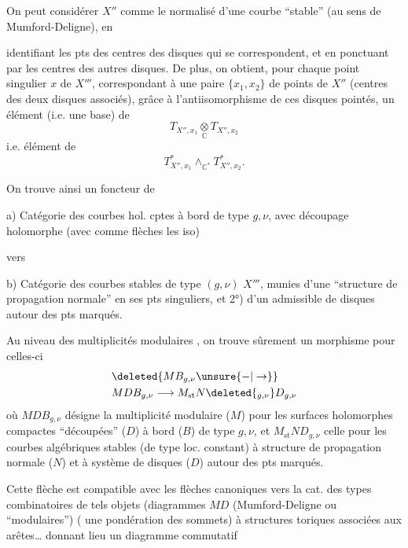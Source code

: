 On peut considérer $X''$ comme le
normalisé d'une courbe   ``stable''
(au sens de Mumford-Deligne), en

identifiant les pts des centres des disques
qui se correspondent, et en ponctuant
par les centres des autres disques.
De plus, on obtient,  pour chaque
point singulier $x$ de $X'''$, correspondant
à une paire $\{x_1,x_2\}$ de points de
$X''$ (centres des deux disques associés),
grâce à l'antiisomorphisme de ces
disques pointés, un élément   (i.e. une base)
de
\[
T_{X'',x_1}\underset{\mathbb C}{\otimes}T_{X'',x_2}
\]
i.e.  élément de
\[
T_{X'',x_1}^{*}\mathbin{\wedge}_{\mathbb C^*}T_{X'',x_2}^{*}.
\]

On trouve ainsi un foncteur de

a) Catégorie  des courbes hol. cptes à bord  de
type $g,\nu$, avec découpage holomorphe
(avec comme flèches les iso)

vers

b) Catégorie des courbes  stables de type $(g,\nu)$
$X'''$, munies  d'une ``structure de propagation
normale'' en ses pts singuliers, et 2°) d'un
  admissible de
disques autour des pts marqués.

Au niveau des multiplicités modulaires ,
on trouve sûrement un morphisme pour
celles-ci
\[
\begin{aligned}
&\deleted{MB_{g,\nu}\unsure{-|\to}}\\
&MDB_{g,\nu}\longrightarrow M_{\mathrm{st}}N\deleted{{}_{g,\nu}}D_{g,\nu}
\end{aligned}
\]
où $MDB_{g,\nu}$ désigne la multiplicité modulaire
($M$) pour les surfaces holomorphes compactes
``découpées'' ($D$) à bord ($B$) de type $g,\nu$, et
$M_{\mathrm{st}}ND_{g,\nu}$ celle pour les courbes algébriques
stables (de type loc. constant)  à structure de
propagation normale ($N$) et à système  de
disques ($D$) autour des pts marqués.

Cette flèche est compatible avec les
flèches canoniques vers la cat. des
types combinatoires  de tels objets
(diagrammes $MD$ (Mumford-Deligne ou
``modulaires'') (  une pondération
des sommets) à structures toriques
associées aux arêtes\ldots{} donnant lieu un
diagramme commutatif

